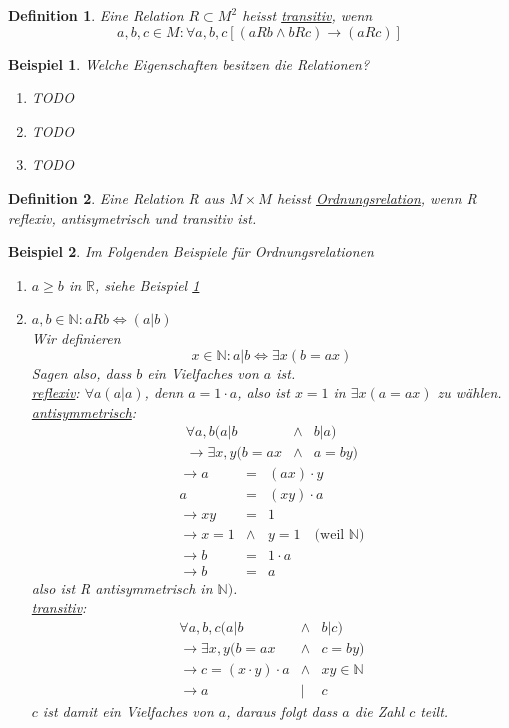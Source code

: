 \documentclass{report}
\newtheorem{mydef}{Definition}
\newtheorem{myexample}{Beispiel}
\begin{document}
\begin{mydef}Eine Relation $R \subset M^2$ heisst \underline{transitiv}, wenn
\begin{equation}a,b,c \in M: \forall a,b,c [(a R b \land b R c) \to (a R c)]\end{equation}\end{mydef}
\begin{myexample}Welche Eigenschaften besitzen die Relationen? \label{relation:examples-properties}
\begin{enumerate}\item TODO
\item TODO
\item TODO\end{enumerate}
\end{myexample}
\begin{mydef}Eine Relation R aus $M \times M$ heisst \underline{Ordnungsrelation}, wenn R reflexiv, antisymetrisch und transitiv ist.\end{mydef}
\begin{myexample}Im Folgenden Beispiele für Ordnungsrelationen\begin{enumerate}
\item $a \geq b$ in $\mathbb{R}$, siehe Beispiel \ref{relation:examples-properties}
\item $a,b \in \mathbb{N}: a R b \iff (a | b)$\\Wir definieren
\begin{equation}x \in \mathbb{N}: a | b \iff \exists x (b = ax)\end{equation}
Sagen also, dass $b$ ein Vielfaches von $a$ ist.\\
\underline{reflexiv}: $\forall a ( a | a)$, denn $a = 1 \cdot a$, also ist $x = 1$ in $\exists x (a = ax)$ zu wählen.
\underline{antisymmetrisch}:
\begin{eqnarray}\forall a,b ( a | b  &\land & b | a) \nonumber \\
\to \exists x,y ( b=ax & \land & a = by)\end{eqnarray}
\begin{eqnarray}
\to a & = & (ax) \cdot y \nonumber \\
a & = & (xy) \cdot a \nonumber \\
\to xy & = & 1 \nonumber \\
\to x=1 & \land & y = 1 \quad \mbox{(weil } \mathbb{N} \mbox{)} \nonumber \\
\to b & = & 1 \cdot a \nonumber \\
\to b & = & a\end{eqnarray}
also ist R antisymmetrisch in $\mathbb{N})$.\\
\underline{transitiv}: \begin{eqnarray}\forall a,b,c ( a | b & \land & b | c ) \nonumber \\
\to \exists x,y (b = ax & \land & c = by) \nonumber \\
\to c = (x \cdot y) \cdot a & \land & xy \in \mathbb{N} \nonumber \\
\to a & | & c\end{eqnarray}
$c$ ist damit ein Vielfaches von $a$, daraus folgt dass $a$ die Zahl $c$ teilt.
\end{enumerate}\end{myexample}
\end{document}
